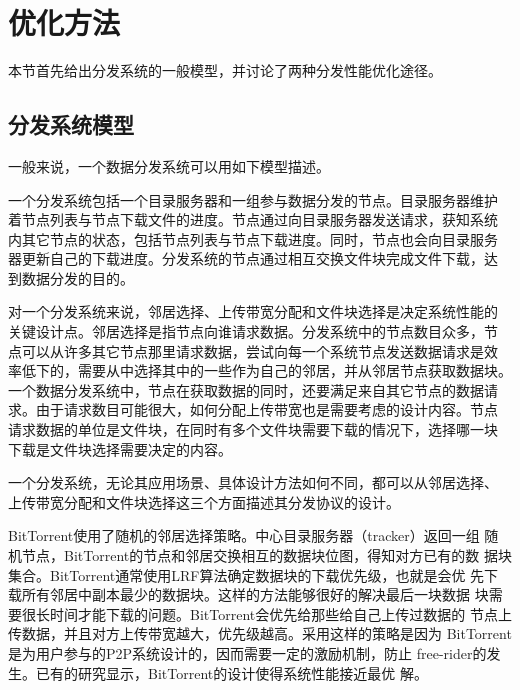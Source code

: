 
\section{优化方法}
\label{sec:btmethod}

本节首先给出分发系统的一般模型，并讨论了两种分发性能优化途径。

\subsection{分发系统模型}

一般来说，一个数据分发系统可以用如下模型描述。

一个分发系统包括一个目录服务器和一组参与数据分发的节点。目录服务器维护
着节点列表与节点下载文件的进度。节点通过向目录服务器发送请求，获知系统
内其它节点的状态，包括节点列表与节点下载进度。同时，节点也会向目录服务
器更新自己的下载进度。分发系统的节点通过相互交换文件块完成文件下载，达
到数据分发的目的。


对一个分发系统来说，邻居选择、上传带宽分配和文件块选择是决定系统性能的
关键设计点。邻居选择是指节点向谁请求数据。分发系统中的节点数目众多，节
点可以从许多其它节点那里请求数据，尝试向每一个系统节点发送数据请求是效
率低下的，需要从中选择其中的一些作为自己的邻居，并从邻居节点获取数据块。
一个数据分发系统中，节点在获取数据的同时，还要满足来自其它节点的数据请
求。由于请求数目可能很大，如何分配上传带宽也是需要考虑的设计内容。节点
请求数据的单位是文件块，在同时有多个文件块需要下载的情况下，选择哪一块
下载是文件块选择需要决定的内容。

一个分发系统，无论其应用场景、具体设计方法如何不同，都可以从邻居选择、
上传带宽分配和文件块选择这三个方面描述其分发协议的设计。

BitTorrent使用了随机的邻居选择策略。中心目录服务器（tracker）返回一组
随机节点，BitTorrent的节点和邻居交换相互的数据块位图，得知对方已有的数
据块集合。BitTorrent通常使用LRF算法确定数据块的下载优先级，也就是会优
先下载所有邻居中副本最少的数据块。这样的方法能够很好的解决最后一块数据
块需要很长时间才能下载的问题。BitTorrent会优先给那些给自己上传过数据的
节点上传数据，并且对方上传带宽越大，优先级越高。采用这样的策略是因为
BitTorrent是为用户参与的P2P系统设计的，因而需要一定的激励机制，防止
free-rider的发生。已有的研究显示，BitTorrent的设计使得系统性能接近最优
解。

